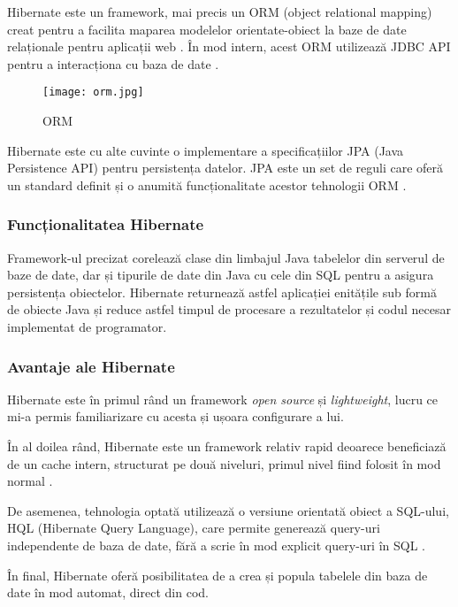 Hibernate este un framework, mai precis un ORM (object relational mapping) creat pentru a facilita maparea modelelor orientate-obiect la baze de date relaționale pentru aplicații web \cite{hibernate1}. În mod intern, acest ORM utilizează JDBC API pentru a interacționa cu baza de date \cite{hibernate2}.

\begin{figure}[H]
	\centering
	\texttt{[image: orm.jpg]}
	\caption{ORM}
\end{figure}

Hibernate este cu alte cuvinte o implementare a specificațiilor JPA (Java Persistence API) pentru persistența datelor. JPA este un set de reguli care oferă un standard definit și o anumită funcționalitate acestor tehnologii ORM \cite{hibernate2}.

\subsubsection{Funcționalitatea Hibernate}

Framework-ul precizat corelează clase din limbajul Java tabelelor din serverul de baze de date, dar și tipurile de date din Java cu cele din SQL pentru a asigura persistența obiectelor. Hibernate returnează astfel aplicației enitățile sub formă de obiecte Java și reduce astfel timpul de procesare a rezultatelor și codul necesar implementat de programator.

\subsubsection{Avantaje ale Hibernate}

Hibernate este în primul rând un framework \textit{open source} și \textit{lightweight}, lucru ce mi-a permis familiarizare cu acesta și ușoara configurare a lui.

În al doilea rând, Hibernate este un framework relativ rapid deoarece beneficiază de un cache intern, structurat pe două niveluri, primul nivel fiind folosit în mod normal \cite{hibernate2}.

De asemenea, tehnologia optată utilizează o versiune orientată obiect a SQL-ului, HQL (Hibernate Query Language), care permite generează query-uri independente de baza de date, fără a scrie în mod explicit query-uri în SQL \cite{hibernate2}.

În final, Hibernate oferă posibilitatea de a crea și popula tabelele din baza de date în mod automat, direct din cod.

